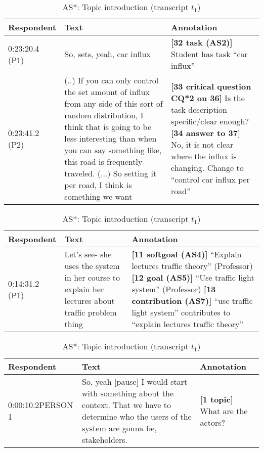 \begin{table}[!htbp]
\begin{tabular}{|p{20mm}|p{70mm}|p{60mm}|}
\hline
Respondent & Text & Annotation\\
\hline
0:23:20.4 (P1) & So, sets, yeah, car influx & \textbf{[32 task (AS2)]} Student has task ``car influx''\\
\hline
0:23:41.2 (P2) & (..) If you can only control the set amount of influx from any side of this sort of random distribution, I think that is going to be less interesting than when you can say something like, this road is frequently traveled. (...) So setting it per road, I think is something we want & \textbf{[33 critical question CQ*2 on 36]} Is the task description specific/clear enough? \newline
\textbf{[34 answer to 37]} No, it is not clear where the influx is changing. Change to ``control car influx per road''\\
\hline
\end{tabular}
\caption{AS2: Task, CQ*2: Specify/clarify element (transcript $t_1$)}
\label{table:transcript:as2-cq_star_2}

\begin{tabular}{|p{20mm}|p{50mm}|p{80mm}|}
\hline
Respondent & Text & Annotation\\
\hline
0:14:31.2 (P1) & Let's see- she uses the system in her course to explain her lectures about traffic problem thing & \textbf{[11 softgoal (AS4)]} ``Explain lectures traffic theory'' (Professor)\newline
\textbf{[12 goal (AS5)]} ``Use traffic light system'' (Professor)\newline
\textbf{[13 contribution (AS7)]} ``use traffic light system'' contributes to ``explain lectures traffic theory''\\
\hline
\end{tabular}
\caption{AS4: softgoal, AS5: goal, AS7: contribution (transcript $t_3$)}
\label{table:transcript:as4-as5-as7}

\begin{tabular}{|p{20mm}|p{90mm}|p{40mm}|}
\hline
Respondent & Text & Annotation\\
\hline
0:00:10.2\newline PERSON 1 & 	So, yeah [pause] I would start with something about the context. That we have to determine who the users of the system are gonna be, stakeholders. & \textbf{[1 topic]} What are the actors?\\
\hline
\end{tabular}
\caption{AS*: Topic introduction (transcript $t_1$)}
\label{table:transcript:as-star}
\end{table}

